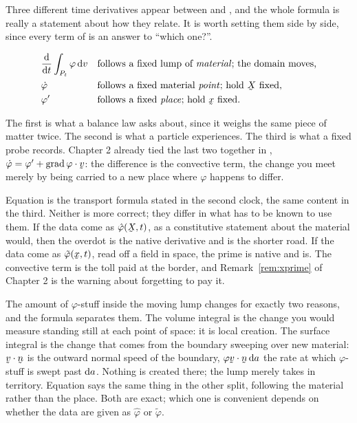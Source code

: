 \begin{remark}\label{rem:twoclocks}
Three different time derivatives appear between  and
, and the whole formula is really a statement about how they
relate. It is worth setting them side by side, since every term of
 is an answer to ``which one?''.

\[
\begin{aligned}
&\frac{\dl}{\dl t}\int_{P_{t}}\varphi\,\dl v
  &&\text{follows a fixed lump of \emph{material}; the domain moves,}\\
&\dot\varphi
  &&\text{follows a fixed material \emph{point}; hold }\bX\text{ fixed,}\\
&\varphi'
  &&\text{follows a fixed \emph{place}; hold }\bx\text{ fixed.}
\end{aligned}
\]

The first is what a balance law asks about, since it weighs the same piece
of matter twice. The second is what a particle experiences. The third is what
a fixed probe records. Chapter 2 already tied the last two together in
, $\dot\varphi=\varphi'+\ip{\grad\varphi}\bv$: the difference is
the convective term, the change you meet merely by being carried to a new
place where $\varphi$ happens to differ.

Equation  is the transport formula stated in the second clock,
 the same content in the third. Neither is more correct; they
differ in what has to be known to use them. If the data come as $\hat\varphi(\bX,t)$, as a constitutive statement
about the material would, then the overdot is the native derivative and
 is the shorter road. If the data come
as $\tilde\varphi(\bx,t)$, read off a field in space, the prime is native
and  is. The convective term is the toll paid at the border, and
Remark~\ref{rem:xprime} of Chapter 2 is the warning about forgetting to
pay it.
\end{remark}

\begin{remark}\label{rem:readreynolds}
The amount of $\varphi$-stuff inside the moving lump changes for exactly
two reasons, and the formula separates them. The volume integral is the
change you would measure standing still at each point of space: it is
local creation. The surface integral is the change that comes from the
boundary sweeping over new material: $\ip\bv\bn$ is the outward normal
speed of the boundary, $\varphi\ip\bv\bn\,\dl a$ the rate at which
$\varphi$-stuff is swept past $\mathrm{d} a$. Nothing is created there; the lump
merely takes in territory. Equation  says the same thing in the
other split, following the material rather than the place. Both are exact;
which one is convenient depends on whether the data are given as
$\hat\varphi$ or $\tilde\varphi$.
\end{remark}

